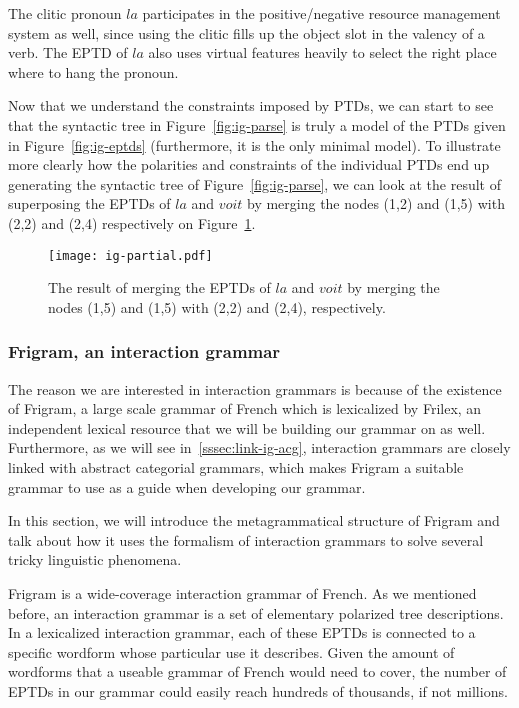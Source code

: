 The clitic pronoun $la$ participates in the positive/negative resource
management system as well, since using the clitic fills up the object
slot in the valency of a verb. The EPTD of $la$ also uses virtual
features heavily to select the right place where to hang the pronoun.

Now that we understand the constraints imposed by PTDs, we can start to
see that the syntactic tree in Figure~\ref{fig:ig-parse} is truly a
model of the PTDs given in Figure~\ref{fig:ig-eptds} (furthermore, it is
the only minimal model). To illustrate more clearly how the polarities
and constraints of the individual PTDs end up generating the syntactic
tree of Figure~\ref{fig:ig-parse}, we can look at the result of
superposing the EPTDs of $la$ and $voit$ by merging the nodes (1,2) and
(1,5) with (2,2) and (2,4) respectively on Figure~\ref{fig:ig-partial}.

\begin{figure}
  \centering
  \texttt{[image: ig-partial.pdf]}
  \caption{\label{fig:ig-partial} The result of merging the EPTDs of
    $la$ and $voit$ by merging the nodes (1,5) and (1,5) with (2,2) and
    (2,4), respectively.}
\end{figure}

\subsubsection{Frigram, an interaction grammar}
\label{sssec:frigram}

The reason we are interested in interaction grammars is because of the
existence of Frigram, a large scale grammar of French which is
lexicalized by Frilex, an independent lexical resource that we will be
building our grammar on as well. Furthermore, as we will see
in~\ref{sssec:link-ig-acg}, interaction grammars are closely linked with
abstract categorial grammars, which makes Frigram a suitable grammar to
use as a guide when developing our grammar.

In this section, we will introduce the metagrammatical structure of
Frigram and talk about how it uses the formalism of interaction grammars
to solve several tricky linguistic phenomena.


Frigram is a wide-coverage interaction grammar of French. As we
mentioned before, an interaction grammar is a set of elementary
polarized tree descriptions. In a lexicalized interaction grammar, each
of these EPTDs is connected to a specific wordform whose particular use
it describes. Given the amount of wordforms that a useable grammar of
French would need to cover, the number of EPTDs in our grammar could
easily reach hundreds of thousands, if not millions.


